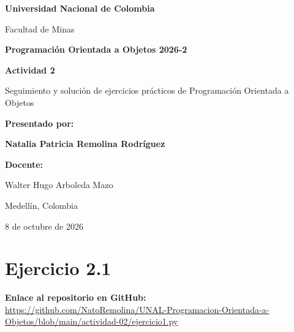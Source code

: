 \documentclass[11pt, a4paper]{article}
\begin{document}
\begin{titlepage}
    \centering
    \vspace*{1cm}

    {\huge \textbf{Universidad Nacional de Colombia}\par}
    \vspace{0.5cm}
    {\Large Facultad de Minas\par}
    \vspace{1.5cm}

    {\Large \textbf{Programación Orientada a Objetos 2026-2}\par}
    \vspace{2cm}

    {\huge \textbf{Actividad 2}\par}
    \vspace{0.5cm}
    {\large Seguimiento y solución de ejercicios prácticos de Programación Orientada a Objetos\par}

    \vspace{3cm}

    \textbf{Presentado por:}\par
    \vspace{0.5cm}
    {\Large \textbf{Natalia Patricia Remolina Rodríguez}\par}

    \vspace{2cm}

    \textbf{Docente:}\par
    Walter Hugo Arboleda Mazo\par

    \vspace{2cm}

    Medellín, Colombia\par
    8 de octubre de 2026
\end{titlepage}

\section{Ejercicio 2.1}

\noindent \textbf{Enlace al repositorio en GitHub:} \\
\url{https://github.com/NatoRemolina/UNAL-Programacion-Orientada-a-Objetos/blob/main/actividad-02/ejercicio1.py}
\end{document}
